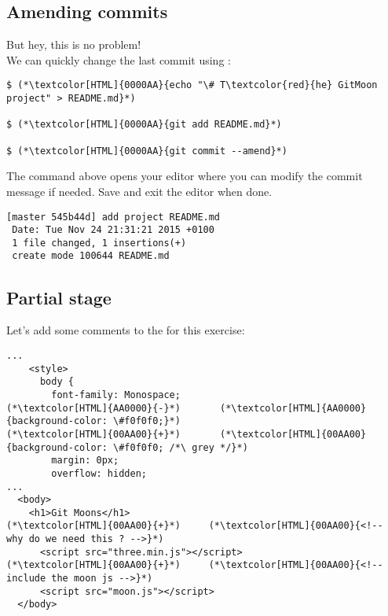 \subsection{Amending commits}
\begin{frame}[fragile]
  \subslidetitle
  But hey, this is no problem!\\
  \vspace{1em}
  We can quickly change the last commit using :

  \begin{lstlisting}
$ (*\textcolor[HTML]{0000AA}{echo "\# T\textcolor{red}{he} GitMoon project" > README.md}*)

$ (*\textcolor[HTML]{0000AA}{git add README.md}*)

$ (*\textcolor[HTML]{0000AA}{git commit --amend}*)
\end{lstlisting}
The command above opens your editor where you can modify the commit message if needed. Save and exit the editor when done.
\begin{lstlisting}
[master 545b44d] add project README.md
 Date: Tue Nov 24 21:31:21 2015 +0100
 1 file changed, 1 insertions(+)
 create mode 100644 README.md
\end{lstlisting}

\end{frame}

\subsection{Partial stage}
\begin{frame}[fragile]
  \subslidetitle
  Let's add some comments to the  for this exercise:

  \begin{lstlisting}
...
    <style>
      body {
        font-family: Monospace;
(*\textcolor[HTML]{AA0000}{-}*)       (*\textcolor[HTML]{AA0000}{background-color: \#f0f0f0;}*)
(*\textcolor[HTML]{00AA00}{+}*)       (*\textcolor[HTML]{00AA00}{background-color: \#f0f0f0; /*\ grey */}*)
        margin: 0px;
        overflow: hidden;
...
  <body>
    <h1>Git Moons</h1>
(*\textcolor[HTML]{00AA00}{+}*)     (*\textcolor[HTML]{00AA00}{<!-- why do we need this ? -->}*)
      <script src="three.min.js"></script>
(*\textcolor[HTML]{00AA00}{+}*)     (*\textcolor[HTML]{00AA00}{<!-- include the moon js -->}*)
      <script src="moon.js"></script>
  </body>
\end{lstlisting}
\end{frame}

